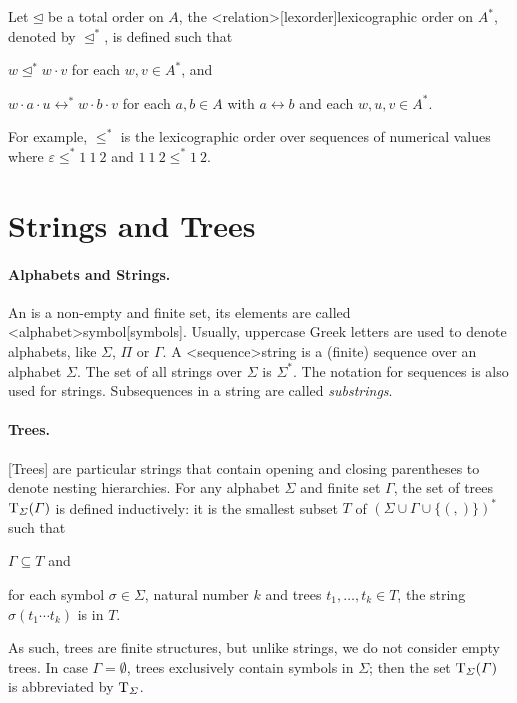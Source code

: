 \documentclass[../document.tex]{subfiles}
\begin{document}
    Let \(\unlhd\) be a total order on \(A\), the <relation>[lexorder]{lexicographic order} on \(A^*\), denoted by \(\unlhd^*\), is defined such that
    \begin{compactenum}
        \item \(w \unlhd^* w \cdot v\) for each \(w, v \in A^*\), and
        \item \(w\cdot a\cdot u \rel^* w\cdot b\cdot v \) for each \(a,b \in A\) with \(a \rel b\) and each \(w,u,v \in A^*\).
    \end{compactenum}
    For example, \(\leq^*\) is the lexicographic order over sequences of numerical values where \(\varepsilon \leq^* 1\:1\:2\) and \(1\:1\:2\leq^*1\:2\).


    \section{Strings and Trees}\label{sec:preliminaries:trees}
    \paragraph{Alphabets and Strings.}
    An  is a non-empty and finite set, its elements are called <alphabet>{symbol}[symbols].
    Usually, uppercase Greek letters are used to denote alphabets, like \(\varSigma\), \(\varPi\) or \(\varGamma\).
    A <sequence>{string} is a (finite) sequence over an alphabet \(\varSigma\).
    The set of all strings over \(\varSigma\) is \(\varSigma^*\).
    The notation for sequences is also used for strings.
    Subsequences in a string are called \emph{substrings}.

    \paragraph{Trees.}
    [Trees] are particular strings that contain opening and closing parentheses to denote nesting hierarchies.
    For any alphabet \(\varSigma\) and finite set \(\varGamma\), the set of trees \(\operatorname{T}_\varSigma(\varGamma)\) is defined inductively: it is the smallest subset \(T\) of \((\varSigma \cup \varGamma \cup \{ (, )\})^*\) such that
    \begin{inparaenum}
        \item \(\varGamma \subseteq T\) and
        \item for each symbol \(\sigma \in \varSigma\), natural number \(k\) and trees \(t_1, \ldots, t_k \in T\), the string \(\sigma(t_1 \cdots t_k)\) is in \(T\).
    \end{inparaenum}
    As such, trees are finite structures, but unlike strings, we do not consider empty trees.
    In case \(\varGamma = \emptyset\), trees exclusively contain symbols in \(\varSigma\); then the set \(\operatorname{T}_\varSigma(\varGamma)\) is abbreviated by \(\operatorname{T}_\varSigma\).
\end{document}
